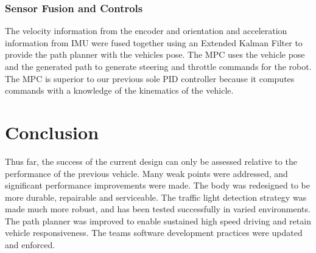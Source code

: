 \documentclass[11pt,journal]{IEEEtran}
\begin{document}
\subsubsection{Sensor Fusion and Controls}
The velocity information from the encoder and orientation and acceleration information from IMU were fused together using an Extended Kalman Filter to provide the path planner with the vehicles pose. The MPC uses the vehicle pose and the generated path to generate steering and throttle commands for the robot. The MPC is superior to our previous sole PID controller because it computes commands with a knowledge of the kinematics of the vehicle.

\section{Conclusion}
Thus far, the success of the current design can only be assessed relative to the performance of the previous vehicle. Many weak points were addressed, and significant performance improvements were made. The body was redesigned to be more durable, repairable  and serviceable. The traffic light detection strategy was made much more robust, and has been tested successfully in varied environments. The path planner was improved to enable sustained high speed driving and retain vehicle responsiveness. The teams software development practices were updated and enforced.


%
\end{document}
